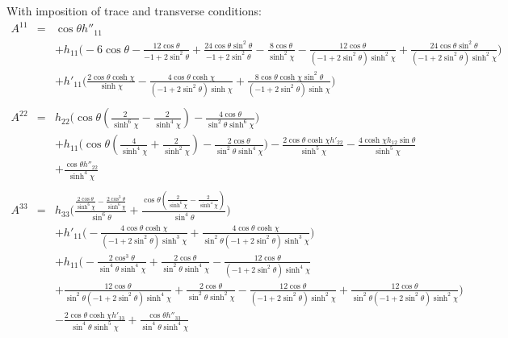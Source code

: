 \documentclass[10pt,letterpaper]{article}
\numberwithin{equation}{section}
\begin{document}
With imposition of trace and transverse conditions:
\begin{eqnarray}
A^{11}&=& \cos\theta h''_{11} \nonumber \\ 
&& + h_{11} \bigl(-6 \cos\theta -  \frac{12 \cos\theta}{-1 + 2 \sin^2\theta} + \frac{24 \cos\theta \sin^2\theta}{-1 + 2 \sin^2\theta} -  \frac{8 \cos\theta}{\sinh^2\chi} -  \frac{12 \cos\theta}{(-1 + 2 \sin^2\theta) \sinh^2\chi} + \frac{24 \cos\theta \sin^2\theta}{(-1 + 2 \sin^2\theta) \sinh^2\chi}\bigr) \nonumber \\ 
&& + h'_{11} \bigl(\frac{2 \cos\theta \cosh\chi}{\sinh\chi} -  \frac{4 \cos\theta \cosh\chi}{(-1 + 2 \sin^2\theta) \sinh\chi} + \frac{8 \cos\theta \cosh\chi \sin^2\theta}{(-1 + 2 \sin^2\theta) \sinh\chi}\bigr)
\\  \nonumber\\ 
A^{22}&=& h_{22} \bigl(\cos\theta (\frac{2}{\sinh^6\chi} -  \frac{2}{\sinh^4\chi}) -  \frac{4 \cos\theta}{\sin^2\theta \sinh^6\chi}\bigr) \nonumber \\ 
&& + h_{11} \bigl(\cos\theta (\frac{4}{\sinh^4\chi} + \frac{2}{\sinh^2\chi}) -  \frac{2 \cos\theta}{\sin^2\theta \sinh^4\chi}\bigr) -  \frac{2 \cos\theta \cosh\chi h'_{22}}{\sinh^5\chi} -  \frac{4 \cosh\chi h_{12} \sin\theta}{\sinh^5\chi} \nonumber \\ 
&& + \frac{\cos\theta h''_{22}}{\sinh^4\chi}
\\  \nonumber\\ 
A^{33}&=& h_{33} \bigl(\frac{\frac{2 \cos\theta}{\sinh^6\chi} -  \frac{2 \cos^3\theta}{\sinh^6\chi}}{\sin^6\theta} + \frac{\cos\theta (\frac{2}{\sinh^6\chi} -  \frac{2}{\sinh^4\chi})}{\sin^4\theta}\bigr) \nonumber \\ 
&& + h'_{11} \bigl(- \frac{4 \cos\theta \cosh\chi}{(-1 + 2 \sin^2\theta) \sinh^3\chi} + \frac{4 \cos\theta \cosh\chi}{\sin^2\theta (-1 + 2 \sin^2\theta) \sinh^3\chi}\bigr) \nonumber \\ 
&& + h_{11} \bigl(- \frac{2 \cos^3\theta}{\sin^4\theta \sinh^4\chi} + \frac{2 \cos\theta}{\sin^2\theta \sinh^4\chi} -  \frac{12 \cos\theta}{(-1 + 2 \sin^2\theta) \sinh^4\chi} 
\nonumber\\
&&+ \frac{12 \cos\theta}{\sin^2\theta (-1 + 2 \sin^2\theta) \sinh^4\chi} + \frac{2 \cos\theta}{\sin^2\theta \sinh^2\chi} -  \frac{12 \cos\theta}{(-1 + 2 \sin^2\theta) \sinh^2\chi} + \frac{12 \cos\theta}{\sin^2\theta (-1 + 2 \sin^2\theta) \sinh^2\chi}\bigr) \nonumber \\ 
&& -  \frac{2 \cos\theta \cosh\chi h'_{33}}{\sin^4\theta \sinh^5\chi} + \frac{\cos\theta h''_{33}}{\sin^4\theta \sinh^4\chi}

\end{eqnarray}
\end{document}
